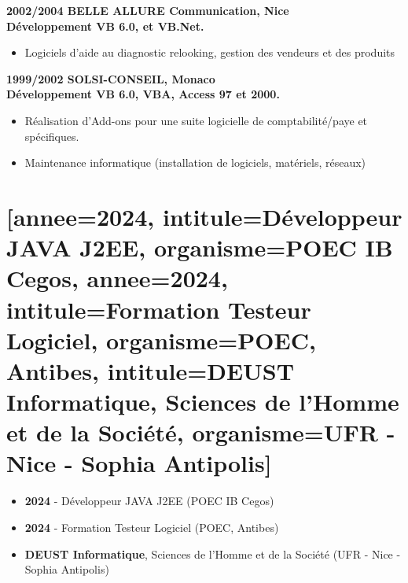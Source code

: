 \documentclass[10pt,a4paper]{article}
\newcommand{\myvspace}{\vspace{0.3cm}}
\begin{document}
\begin{minipage}[t]{0.65\textwidth}
    \myvspace
    \textbf{2002/2004 BELLE ALLURE Communication, Nice \\
    Développement VB 6.0, et VB.Net. }
        \begin{itemize}[nosep, leftmargin=*, itemsep=0pt, parsep=0pt]
            \item Logiciels d’aide au diagnostic relooking, gestion des vendeurs et des produits 
        \end{itemize}
    \myvspace 
    \textbf{1999/2002 SOLSI-CONSEIL, Monaco \\
    Développement VB 6.0, VBA, Access 97 et 2000. }
        \begin{itemize}[nosep, leftmargin=*, itemsep=0pt, parsep=0pt]
            \item Réalisation d’Add-ons pour une suite logicielle de comptabilité/paye et spécifiques.
            \item Maintenance informatique (installation de logiciels, matériels, réseaux)
        \end{itemize}
    \myvspace
    \section*{[{annee=2024, intitule=Développeur JAVA J2EE, organisme=POEC IB Cegos}, {annee=2024, intitule=Formation Testeur Logiciel, organisme=POEC, Antibes}, {intitule=DEUST Informatique, Sciences de l’Homme et de la Société, organisme=UFR - Nice - Sophia Antipolis}]}
    \begin{itemize}[nosep, leftmargin=*, itemsep=0pt, parsep=0pt]
        \item \textbf{2024} - Développeur JAVA J2EE (POEC IB Cegos)
        \item \textbf{2024} - Formation Testeur Logiciel (POEC, Antibes) 
        \item \textbf{DEUST Informatique}, Sciences de l’Homme et de la Société (UFR - Nice - Sophia Antipolis)
    \end{itemize}

\end{minipage}
\end{document}
